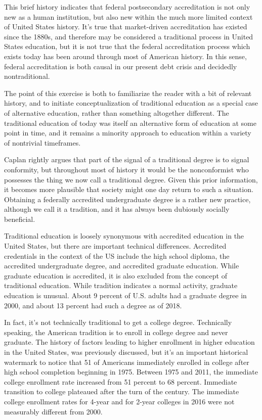 \documentclass[AER]{/Users/zyl357/Documents/GitHub/research-dissertation-case-for-alt-ed/papers/alt-ed-survey/aea-latex-templates/AEA}
\begin{document}
This brief history indicates that federal postsecondary accreditation is
not only new as a human institution, but also new within the much more
limited context of United States history. It’s true that market-driven
accreditation has existed since the 1880s, and therefore may be considered
a traditional process in United States education, but it is not true that
the federal accreditation process which exists today has been around
through most of American history. In this sense, federal accreditation is
both causal in our present debt crisis and decidedly nontraditional.

The point of this exercise is both to familiarize the reader with a bit of
relevant history, and to initiate conceptualization of traditional
education as a special case of alternative education, rather than
something altogether different. The traditional education of today was
itself an alternative form of education at some point in time, and it
remains a minority approach to education within a variety of nontrivial
timeframes.

Caplan rightly argues that part of the signal of a traditional degree is
to signal conformity, but throughout most of history it would be the
nonconformist who possesses the thing we now call a traditional degree.
Given this prior information, it becomes more plausible that society might
one day return to such a situation. Obtaining a federally accredited
undergraduate degree is a rather new practice, although we call it a
tradition, and it has always been dubiously socially beneficial.

Traditional education is loosely synonymous with accredited education in
the United States, but there are important technical differences.
Accredited credentials in the context of the US include the high school
diploma, the accredited undergraduate degree, and accredited graduate
education. While graduate education is accredited, it is also excluded
from the concept of traditional education. While tradition indicates a
normal activity, graduate education is unusual. About 9 percent of U.S. adults
had a graduate degree in 2000, and about 13 percent had such a degree as of 2018\cite{americacountsstaff_2019}.

In fact, it’s not technically traditional to get a college degree.
Technically speaking, the American tradition is to enroll in college
degree and never graduate. The history of factors leading to higher
enrollment in higher education in the United States, was previously
discussed, but it’s an important historical watermark to notice that 51%
of Americans immediately enrolled in college after high school completion
beginning in 1975\cite{aud2013condition}. Between 1975 and 2011, the immediate college enrollment
rate increased from 51 percent to 68 percent. Immediate transition to
college plateaued after the turn of the century. The immediate college
enrollment rates for 4-year and for 2-year colleges in 2016 were not
measurably different from 2000\cite{nces2019condition}.
\end{document}
